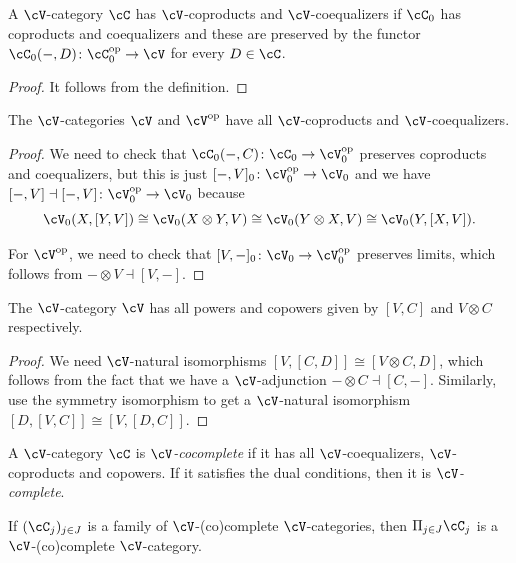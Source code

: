\documentclass[a4paper,11pt,oneside,openany]{scrbook}
\begin{document}
\begin{prop}
	A $\cV$-category $\cC$ has $\cV$-coproducts and $\cV$-coequalizers if
    $\cC_0$ has coproducts and coequalizers and these are preserved by the
    functor $\cC_0(-,D)\colon\cC_0^{\op}\rightarrow\cV$ for every $D\in\cC$.
\end{prop}

\begin{proof}
	It follows from the definition.
\end{proof}

\begin{cor}
	The $\cV$-categories $\cV$ and $\cV^{\op}$ have all $\cV$-coproducts and $\cV$-coequalizers.
\end{cor}

\begin{proof}
    We need to check that $\cC_0(-,C)\colon\cC_0\rightarrow\cV_0^{\op}$ preserves
    coproducts and coequalizers, but this is just
    $[-,V]_0\colon\cV_0^{\op}\rightarrow\cV_0$ and we have
    $[-,V]\dashv[-,V]\colon\cV_0^{\op}\rightarrow\cV_0$ because
	$$\cV_0(X,[Y,V])\cong\cV_0(X\otimes Y,V)\cong\cV_0(Y\otimes
    X,V)\cong\cV_0(Y,[X,V]).$$

	For $\cV^{\op}$, we need to check that $[V,-]_0\colon\cV_0\rightarrow\cV_0^{\op}$ preserves limits, which follows from $-\otimes V\dashv [V,-]$.
\end{proof}

\begin{prop}
	The $\cV$-category $\cV$ has all powers and copowers given by $[V,C]$ and $V\otimes C$ respectively.
\end{prop}

\begin{proof}
	We need $\cV$-natural isomorphisms $[V,[C,D]]\cong[V\otimes C,D]$, which follows from the fact that we have a $\cV$-adjunction $-\otimes C\dashv [C,-]$. Similarly, use the symmetry isomorphism to get a $\cV$-natural isomorphism $[D,[V,C]]\cong[V,[D,C]]$.
\end{proof}

\begin{defn}
	A $\cV$-category $\cC$ is \emph{$\cV$-cocomplete} if it has all $\cV$-coequalizers, $\cV$-coproducts and copowers. If it satisfies the dual conditions, then it is \emph{$\cV$-complete}.
\end{defn}

\begin{exmp}
	If $(\cC_j)_{j\in J}$ is a family of $\cV$-(co)complete $\cV$-categories, then $\Pi_{j\in J}\cC_j$ is a $\cV$-(co)complete $\cV$-category.
\end{exmp}
\end{document}
